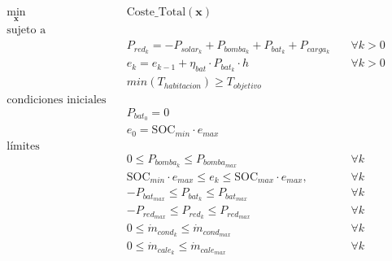 \begin{align}
	\min_{\mathbf{x}} \quad & \text{Coste\_Total}(\mathbf{x})                                                                                                            \\
	\text{sujeto a} \quad   & \nonumber                                                                                                                                  \\
	                        & P_{red_k} = -P_{solar_k} + P_{bomba_k} + P_{bat_k} + P_{carga_k} \quad                                                     & \forall k > 0 \\
	                        & e_k = e_{k-1} + \eta_{bat} \cdot P_{bat_k} \cdot h \quad                                                                   & \forall k > 0 \\
	                        & min(T_{habitacion}) \geq T_{objetivo}                                               \label{eq:min_t_habitacion_constraint}                 \\
	\text{condiciones iniciales} \quad \nonumber                                                                                                                         \\
	                        & P_{bat_0} = 0                                                                                                                              \\
	                        & e_0 = \text{SOC}_{min} \cdot e_{max}                                                                                                       \\
	\text{límites} \quad    & \nonumber                                                                                                                                  \\
	                        & 0 \leq P_{bomba_k} \leq P_{bomba_{max}} \quad                                                                              & \forall k     \\
	                        & \text{SOC}_{min} \cdot e_{max} \leq e_k \leq \text{SOC}_{max} \cdot e_{max}, \quad                                         & \forall k     \\
	                        & -P_{bat_{max}} \leq P_{bat_k} \leq P_{bat_{max}} \quad                                                                     & \forall k     \\
	                        & -P_{red_{max}} \leq P_{red_k} \leq P_{red_{max}} \quad                                                                     & \forall k     \\
	                        & 0 \leq \dot{m}_{cond_k} \leq \dot{m}_{cond_{max}} \quad                                                                    & \forall k     \\
	                        & 0 \leq \dot{m}_{cale_k} \leq \dot{m}_{cale_{max}} \quad                                                                    & \forall k
\end{align}


